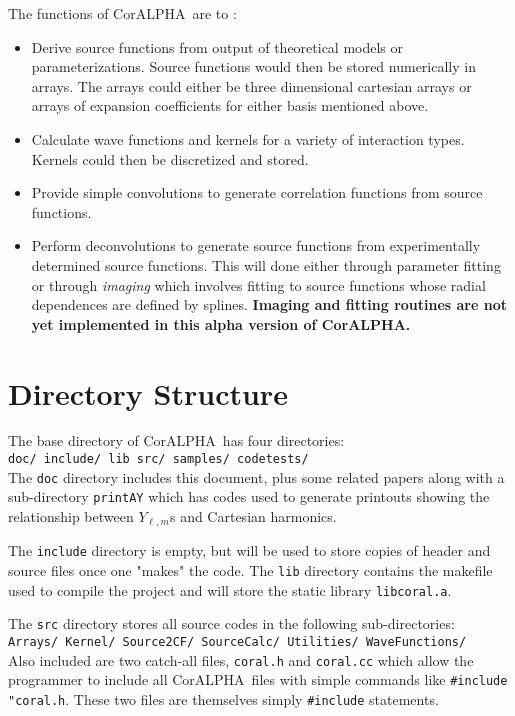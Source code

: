 \documentclass[10pt]{article}
\def\tab{\hspace*{9pt}}
\newcommand{\projectname}{CorALPHA}
\begin{document}
The functions of \projectname\ are to :
\begin{itemize}
\item Derive source functions from output of theoretical models or parameterizations. Source functions would then be stored numerically in arrays. The arrays could either be three dimensional cartesian arrays or arrays of expansion coefficients for either basis mentioned above.
\item Calculate wave functions and kernels for a variety of interaction types. Kernels could then be discretized and stored.
\item Provide simple convolutions to generate correlation functions from source functions.
\item Perform deconvolutions to generate source functions from experimentally determined source functions. This will done either through parameter fitting or through {\it imaging} which involves fitting to source functions whose radial dependences are defined by splines. {\bf Imaging and fitting routines are not yet implemented in this alpha version of \projectname.}
\end{itemize}

\section{Directory Structure}

The base directory of \projectname\ has four directories:\\
{\tt doc/ \tab include/ \tab lib \tab src/ \tab samples/ \tab codetests/}\\
The {\tt doc} directory includes this document, plus some related papers along with a sub-directory {\tt printAY} which has codes used to generate printouts showing the relationship between $Y_{\ell,m}$s and Cartesian harmonics.

The {\tt include} directory is empty, but will be used to store copies of header and source files once one "makes" the code. The {\tt lib} directory contains the  makefile used to compile the project and will store the static library {\tt libcoral.a}.

The {\tt src} directory stores all source codes in the following sub-directories:\\
{\tt Arrays/ \tab Kernel/ \tab Source2CF/ \tab SourceCalc/ \tab Utilities/ 
\tab WaveFunctions/}\\
Also included are two catch-all files, {\tt coral.h} and {\tt coral.cc} which allow the programmer to include all \projectname\ files with simple commands like {\tt \#include "coral.h}. These two files are themselves simply {\tt \#include} statements.
\end{document}
